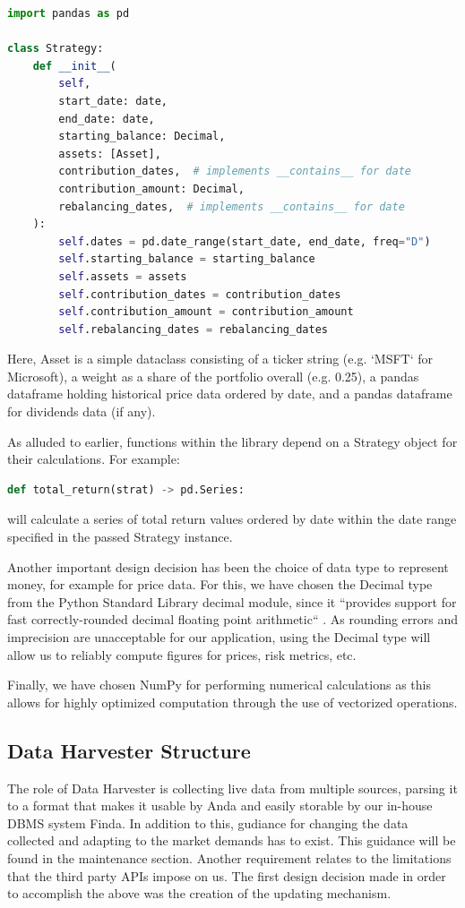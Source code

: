 \documentclass[main.tex]{subfiles}
\begin{document}
\begin{lstlisting}[language=Python, caption=setup.py - Development environment, label=lst:Development_env]
import pandas as pd

class Strategy:
    def __init__(
        self,
        start_date: date,
        end_date: date,
        starting_balance: Decimal,
        assets: [Asset],
        contribution_dates,  # implements __contains__ for date
        contribution_amount: Decimal,
        rebalancing_dates,  # implements __contains__ for date
    ):
        self.dates = pd.date_range(start_date, end_date, freq="D")
        self.starting_balance = starting_balance
        self.assets = assets
        self.contribution_dates = contribution_dates
        self.contribution_amount = contribution_amount
        self.rebalancing_dates = rebalancing_dates
\end{lstlisting}

Here, Asset is a simple dataclass consisting of a ticker string (e.g. `MSFT` for Microsoft), a weight as a share of the portfolio overall (e.g. 0.25), a pandas dataframe holding historical price data ordered by date, and a pandas dataframe for dividends data (if any).

As alluded to earlier, functions within the library depend on a Strategy object for their calculations. For example:

\begin{lstlisting}[language=Python, caption=setup.py - Development environment, label=lst:Development_env]
def total_return(strat) -> pd.Series:
\end{lstlisting}
will calculate a series of total return values ordered by date within the date range specified in the passed Strategy instance.

Another important design decision has been the choice of data type to represent money, for example for price data. For this, we have chosen the Decimal type from the Python Standard Library decimal module, since it ``provides support for fast correctly-rounded decimal floating point arithmetic`` \cite{PyDecimal}. As rounding errors and imprecision are unacceptable for our application, using the Decimal type will allow us to reliably compute figures for prices, risk metrics, etc.

Finally, we have chosen NumPy \cite{walt2011numpy} for performing numerical calculations as this allows for highly optimized computation through the use of vectorized operations.

\subsection{Data Harvester Structure}
The role of Data Harvester is collecting live data from multiple sources, parsing it to a format that makes it usable by Anda and easily storable by our in-house DBMS system Finda. In addition to this, gudiance for changing the data collected and adapting to the market demands has to exist. This guidance will be found in the maintenance section. Another requirement relates to the limitations that the third party APIs impose on us. The first design decision made in order to accomplish the above was the creation of the updating mechanism.
\end{document}
